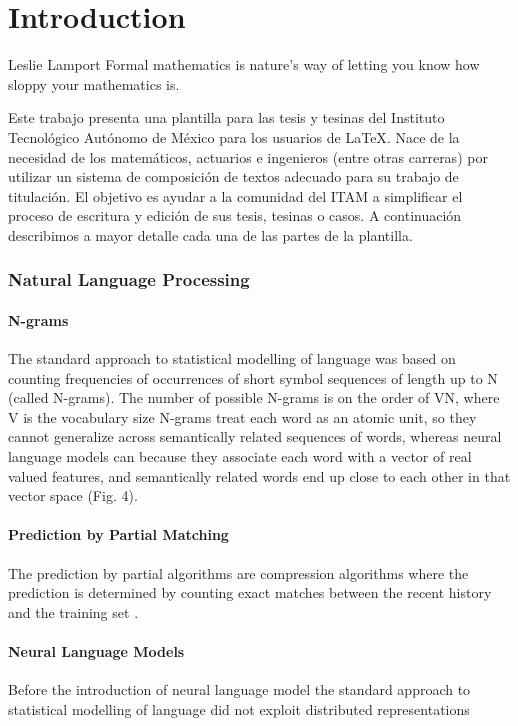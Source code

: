 \chapter{Introduction}
\label{ch:intro}

\begin{chapterquote}{Leslie Lamport}
	Formal mathematics is nature's way of letting you know how sloppy
your mathematics is.
\end{chapterquote}

Este trabajo presenta una plantilla para las tesis y tesinas del Instituto Tecnológico Autónomo de México para los usuarios de \LaTeX \cite{lamport1994latex}. Nace de la necesidad de los matemáticos, actuarios e ingenieros (entre otras carreras) por utilizar un sistema de composición de textos adecuado para su trabajo de titulación. El objetivo es ayudar a la comunidad del ITAM a simplificar el proceso de escritura y edición de sus tesis, tesinas o casos. A continuación describimos a mayor detalle cada una de las partes de la plantilla.

\subsection{Natural Language Processing}
	\subsubsection{N-grams}
The standard approach to statistical modelling of language was based on counting frequencies of occurrences of short symbol sequences of length up to N (called N-grams). The number of possible N-grams is on the order of VN, where V is the vocabulary size N-grams treat each word as an atomic unit, so they cannot generalize across semantically related sequences of words, whereas neural language models can because they associate each word with a vector of real valued features, and semantically related words end up close to each other in that vector space (Fig. 4).\cite{lecun2015deep}

    \subsubsection{Prediction by Partial Matching}
The prediction by partial algorithms are compression algorithms where the prediction is determined by counting exact matches between the recent history and the training set \cite{graves2013generating}.
    
    \subsubsection{Neural Language Models}
Before the introduction of neural language model the standard approach to statistical modelling of language did not exploit distributed representations\cite{lecun2015deep}

